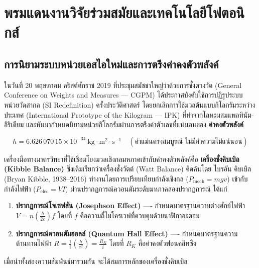 \section{พรมแดนงานวิจัยร่วมสมัยและเทคโนโลยีโฟตอนิกส์}

\subsection{การนิยามระบบหน่วยเอสไอใหม่และการตรึงค่าคงตัวพลังค์}

ในวันที่ 20 พฤษภาคม คริสต์ศักราช 2019 ที่ประชุมสมัชชาใหญ่ว่าด้วยการชั่งตวงวัด (General Conference on Weights and Measures --- CGPM) ได้ประกาศบังคับใช้การปฏิรูประบบหน่วยวัดสากล (SI Redefinition) ครั้งประวัติศาสตร์ โดยยกเลิกการใช้มวลต้นแบบกิโลกรัมระหว่างประเทศ (International Prototype of the Kilogram --- IPK) ที่ทำจากโลหะผสมแพลทินัม-อิริเดียม และหันมากำหนดนิยามหน่วยกิโลกรัมผ่านการตรึงค่าตัวเลขที่แน่นอนของ \textbf{ค่าคงตัวพลังค์}

\begin{equation}
h = 6.626\,070\,15 \times 10^{-34}~\text{kg}\cdot\text{m}^2\cdot\text{s}^{-1} \quad (\text{ค่าแม่นตรงสมบูรณ์ ไม่มีค่าความไม่แน่นอน})
\label{eq:exact_planck_value}
\end{equation}

เครื่องมือทางมาตรวิทยาที่ใช้เชื่อมโยงมวลเชิงกลมหภาคเข้ากับค่าคงตัวพลังค์คือ \textbf{เครื่องชั่งคิบเบิล (Kibble Balance)} ซึ่งเดิมเรียกว่าเครื่องชั่งวัตต์ (Watt Balance) คิดค้นโดย ไบรอัน คิบเบิล (Bryan Kibble, 1938--2016) ทำงานโดยการเปรียบเทียบกำลังเชิงกล ($P_{\text{mech}} = m g v$) เข้ากับกำลังไฟฟ้า ($P_{\text{elec}} = V I$) ผ่านปรากฏการณ์ควอนตัมระดับมหภาคสองปรากฏการณ์ ได้แก่

\begin{enumerate}
    \item \textbf{ปรากฏการณ์โจเซฟสัน (Josephson Effect)} ---- กำหนดมาตรฐานความต่างศักย์ไฟฟ้า $V = n \left(\frac{h}{2e}\right) f$ โดยที่ $f$ คือความถี่ไมโครเวฟที่ควบคุมด้วยนาฬิกาอะตอม
    \item \textbf{ปรากฏการณ์ควอนตัมฮอลล์ (Quantum Hall Effect)} ---- กำหนดมาตรฐานความต้านทานไฟฟ้า $R = \frac{1}{i}\left(\frac{h}{e^2}\right) = \frac{R_K}{i}$ โดยที่ $R_K$ คือค่าคงตัวฟอนคลิทซิง
\end{enumerate}

เมื่อนำทั้งสองความสัมพันธ์มารวมกัน จะได้สมการหลักของเครื่องชั่งคิบเบิล

